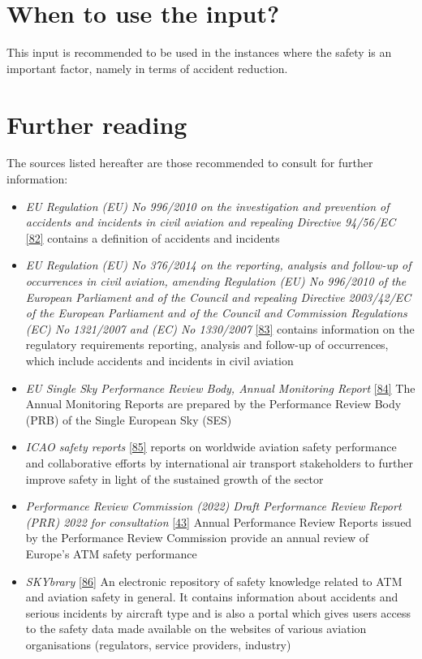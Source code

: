 \documentclass[
  11pt,
  a4paper,
]{book}
\begin{document}
\hypertarget{when-to-use-the-input-9}{%
\section{When to use the input?}\label{when-to-use-the-input-9}}

This input is recommended to be used in the instances where the safety
is an important factor, namely in terms of accident reduction.

\hypertarget{further-reading-3}{%
\section{Further reading}\label{further-reading-3}}

The sources listed hereafter are those recommended to consult for
further information:

\begin{itemize}
\item
  \emph{EU Regulation (EU) No 996/2010 on the investigation and
  prevention of accidents and incidents in civil aviation and repealing
  Directive 94/56/EC} \protect\hyperlink{ref-eureg9962010}{{[}82{]}}
  contains a definition of accidents and incidents
\item
  \emph{EU Regulation (EU) No 376/2014 on the reporting, analysis and
  follow-up of occurrences in civil aviation, amending Regulation (EU)
  No 996/2010 of the European Parliament and of the Council and
  repealing Directive 2003/42/EC of the European Parliament and of the
  Council and Commission Regulations (EC) No 1321/2007 and (EC) No
  1330/2007} \protect\hyperlink{ref-eureg3762014}{{[}83{]}} contains
  information on the regulatory requirements reporting, analysis and
  follow-up of occurrences, which include accidents and incidents in
  civil aviation
\item
  \emph{EU Single Sky Performance Review Body, Annual Monitoring Report}
  \protect\hyperlink{ref-EUSingleSky}{{[}84{]}} The Annual Monitoring
  Reports are prepared by the Performance Review Body (PRB) of the
  Single European Sky (SES)
\item
  \emph{ICAO safety reports}
  \protect\hyperlink{ref-icao:safety}{{[}85{]}} reports on worldwide
  aviation safety performance and collaborative efforts by international
  air transport stakeholders to further improve safety in light of the
  sustained growth of the sector
\item
  \emph{Performance Review Commission (2022) Draft Performance Review
  Report (PRR) 2022 for consultation}
  \protect\hyperlink{ref-ectrlprr2022}{{[}43{]}} Annual Performance
  Review Reports issued by the Performance Review Commission provide an
  annual review of Europe's ATM safety performance
\item
  \emph{SKYbrary} \protect\hyperlink{ref-SkyBrary}{{[}86{]}} An
  electronic repository of safety knowledge related to ATM and aviation
  safety in general. It contains information about accidents and serious
  incidents by aircraft type and is also a portal which gives users
  access to the safety data made available on the websites of various
  aviation organisations (regulators, service providers, industry)
\end{itemize}
\end{document}
